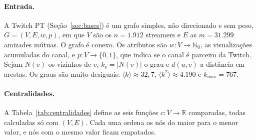 \paragraph{Entrada.} A Twitch PT (Seção~\ref{sec:bases}) é um grafo simples,
não direcionado e sem peso, $G = (V, E, w, p)$, em que $V$ são os $n = 1.912$ streamers e $E$ as
$m = 31.299$ amizades mútuas. O grafo é conexo. Os atributos são $w \colon V \to \mathbb{N}_0$, as
visualizações acumuladas do canal, e $p \colon V \to \{0, 1\}$, que indica se o canal é parceiro da
Twitch. Sejam $N(v)$ os vizinhos de $v$, $k_v = |N(v)|$ o grau e $d(u, v)$ a distância em arestas.
Os graus são muito desiguais: $\langle k \rangle \approx 32{,}7$,
$\langle k^2 \rangle \approx 4.190$ e $k_{\max} = 767$.

\paragraph{Centralidades.} A Tabela~\ref{tab:centralidades} define as seis funções
$c \colon V \to \mathbb{R}$ comparadas, todas calculadas só com $(V, E)$. Cada uma ordena os nós do
maior para o menor valor, e nós com o mesmo valor ficam empatados.

\begin{table}[htbp]
\centering
\caption{Centralidades comparadas. $\sigma_{st}$ é o número de caminhos mínimos entre $s$ e $t$,
$\sigma_{st}(v)$ quantos passam por $v$, $V_k$ os nós do $k$-núcleo, o maior subgrafo induzido
com grau mínimo $k$, e $\alpha = 0{,}85$. O custo do PageRank é por iteração.}
\label{tab:centralidades}
\small
\setlength{\tabcolsep}{3pt}
\end{table}

